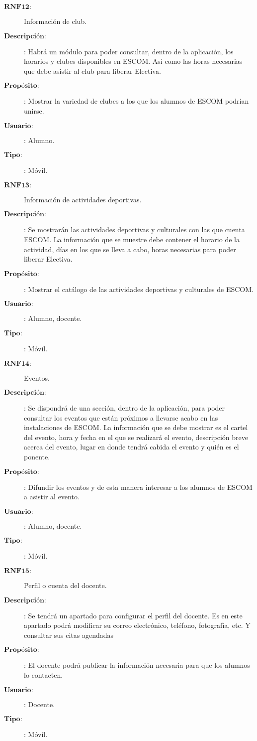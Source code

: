 \begin{description}
\item[$\textbf{RNF12:}$] Información de club.
\item[$\textbf{Descripción:}$]:  Habrá un módulo para poder consultar, dentro de la aplicación, los horarios y clubes disponibles en ESCOM. Así como las horas necesarias que debe asistir al club para liberar Electiva.
\item[$\textbf{Propósito:}$]: Mostrar la variedad de clubes a los que los alumnos de ESCOM podrían unirse.
\item[$\textbf{Usuario:}$]: Alumno.
\item[$\textbf{Tipo:}$]: Móvil. \\

\item[$\textbf{RNF13:}$] Información de actividades deportivas.
\item[$\textbf{Descripción:}$]:  Se mostrarán las actividades deportivas y culturales con las que cuenta ESCOM. La información que se muestre debe contener el horario de la actividad, días en los que se lleva a cabo, horas necesarias para poder liberar Electiva.
\item[$\textbf{Propósito:}$]: Mostrar el catálogo de las actividades deportivas y culturales de ESCOM.
\item[$\textbf{Usuario:}$]: Alumno, docente.
\item[$\textbf{Tipo:}$]: Móvil. \\

\item[$\textbf{RNF14:}$] Eventos.
\item[$\textbf{Descripción:}$]:  Se dispondrá de una sección, dentro de la aplicación, para poder consultar los eventos que están próximos a llevarse acabo en las instalaciones de ESCOM. La información que se debe mostrar es el cartel del evento, hora y fecha en el que se realizará el evento, descripción breve acerca del evento, lugar en donde tendrá cabida el evento y quién es el ponente.
\item[$\textbf{Propósito:}$]: Difundir los eventos y de esta manera interesar a los alumnos de ESCOM a asistir al evento.
\item[$\textbf{Usuario:}$]: Alumno, docente.
\item[$\textbf{Tipo:}$]: Móvil. \\

\item[$\textbf{RNF15:}$] Perfil o cuenta del docente.
\item[$\textbf{Descripción:}$]: Se tendrá un apartado para configurar el perfil del docente. Es en este apartado podrá modificar su correo electrónico, teléfono, fotografía, etc. Y consultar sus citas agendadas
\item[$\textbf{Propósito:}$]: El docente podrá publicar la información necesaria para que los alumnos lo contacten.
\item[$\textbf{Usuario:}$]: Docente.
\item[$\textbf{Tipo:}$]: Móvil. \\


\end{description}
